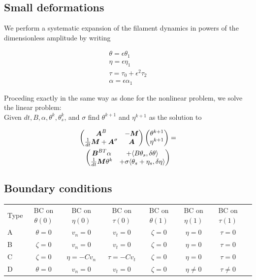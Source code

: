 \subsection{Small deformations}\label{small-deformations}

We perform a systematic expansion of the filament dynamics in powers of the dimensionless amplitude \epsilon by writing

$$
\begin{aligned}
\theta = \epsilon\theta_1 \\
\eta = \epsilon\eta_1 \\
\tau = \tau_0 + \epsilon^2 \tau_2 \\
\alpha = \epsilon \alpha_1
\end{aligned}
$$

Proceding exactly in the same way as done for the nonlinear problem, we solve the linear problem:\\
Given $dt, B, \alpha, \theta^k, \theta^k_s$, and $\sigma$ find
$\theta^{k+1}$ and $\eta^{k+1}$ as the solution to

\begin{multline}

\begin{pmatrix}
\vv A^B &  -\vv M  \\
\frac{1}{dt} \vv M + \vv A^\sigma & \vv A \\
\end{pmatrix}
%
\begin{pmatrix}
\theta^{k+1}\phantom{\big|\!\!}\\
\eta^{k+1}\phantom{\big|\!\!} 
\end{pmatrix}
=\\
\begin{pmatrix}
\vv B^{BT}\alpha & +\langle B\theta_s, \delta \theta\rangle\\
\frac{1}{dt} \vv M \theta^k& +\sigma \langle \theta_s+\eta_s,\delta\eta\rangle
\end{pmatrix}
\end{multline}


\subsection{Boundary conditions}\label{boundary-conditions}

\begin{tabular}{l|c|c|c|c||c|c|c|}
  Type & BC on $\theta(0)$ & BC on $\eta(0)$ & BC on $\tau(0)$ & BC on $\theta(1)$ & BC on $\eta(1)$ & BC on $\tau(1)$ \\
  A & $\theta = 0$ & $v_n = 0$ & $v_t=0$ & $\zeta = 0$ &  $\eta = 0$& $\tau = 0$  \\
  B & $\zeta = 0$ & $v_n = 0$ & $v_t=0$  & $\zeta = 0$&  $\eta = 0$& $\tau = 0$ \\
  C &  $\zeta = 0$ & $\eta = -C v_n$& $\tau =  -C v_t$ & $\zeta = 0$&  $\eta = 0$& $\tau = 0$ \\
  D  &  $\theta = 0$ & $v_n = 0$& $v_t=0$ & $\zeta = 0$& $\eta \neq 0$& $\tau \neq 0$ 
\end{tabular}


